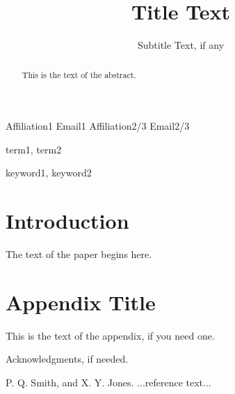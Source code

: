 \documentclass[10pt]{sigplanconf}
\begin{document}



\title{Title Text}
\subtitle{Subtitle Text, if any}

           {Affiliation1}
           {Email1}
           {Affiliation2/3}
           {Email2/3}

\maketitle

\begin{abstract}
This is the text of the abstract.
\end{abstract}


\terms
term1, term2

\keywords
keyword1, keyword2

\section{Introduction}

The text of the paper begins here.

\appendix
\section{Appendix Title}

This is the text of the appendix, if you need one.

\acks

Acknowledgments, if needed.





\begin{thebibliography}{}
\softraggedright

P. Q. Smith, and X. Y. Jones. ...reference text...

\end{thebibliography}
\end{document}
